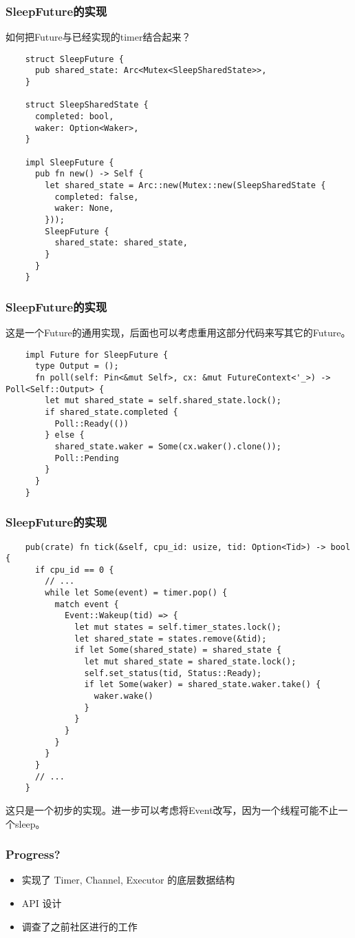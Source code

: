 \documentclass[UTF-8]{ctexbeamer}
\begin{document}
\begin{frame}[fragile]
  \frametitle{SleepFuture的实现}

  如何把Future与已经实现的timer结合起来？
  {
  \scriptsize
  \begin{verbatim}
    struct SleepFuture {
      pub shared_state: Arc<Mutex<SleepSharedState>>,
    }

    struct SleepSharedState {
      completed: bool,
      waker: Option<Waker>,
    }

    impl SleepFuture {
      pub fn new() -> Self {
        let shared_state = Arc::new(Mutex::new(SleepSharedState {
          completed: false,
          waker: None,
        }));
        SleepFuture {
          shared_state: shared_state,
        }
      }
    }
  \end{verbatim}
  }
\end{frame}

\begin{frame}[fragile]
  \frametitle{SleepFuture的实现}

  这是一个Future的通用实现，后面也可以考虑重用这部分代码来写其它的Future。
  {
  \scriptsize
  \begin{verbatim}
    impl Future for SleepFuture {
      type Output = ();
      fn poll(self: Pin<&mut Self>, cx: &mut FutureContext<'_>) -> Poll<Self::Output> {
        let mut shared_state = self.shared_state.lock();
        if shared_state.completed {
          Poll::Ready(())
        } else {
          shared_state.waker = Some(cx.waker().clone());
          Poll::Pending
        }
      }
    }    
  \end{verbatim}
  }
\end{frame}

\begin{frame}[fragile]
  \frametitle{SleepFuture的实现}

  {
    \scriptsize
    \begin{verbatim}
    pub(crate) fn tick(&self, cpu_id: usize, tid: Option<Tid>) -> bool {
      if cpu_id == 0 {
        // ...
        while let Some(event) = timer.pop() {
          match event {
            Event::Wakeup(tid) => {
              let mut states = self.timer_states.lock();
              let shared_state = states.remove(&tid);
              if let Some(shared_state) = shared_state {
                let mut shared_state = shared_state.lock();
                self.set_status(tid, Status::Ready);
                if let Some(waker) = shared_state.waker.take() {
                  waker.wake()
                }
              }
            }
          }
        }
      }
      // ...
    }
  \end{verbatim}
  }

  这只是一个初步的实现。进一步可以考虑将Event改写，因为一个线程可能不止一个sleep。
\end{frame}

\begin{frame}
  \frametitle{Progress?}

  \begin{itemize}
    \item 实现了 Timer, Channel, Executor 的底层数据结构
    \item API 设计
    \item 调查了之前社区进行的工作
  \end{itemize}
\end{frame}
\end{document}
